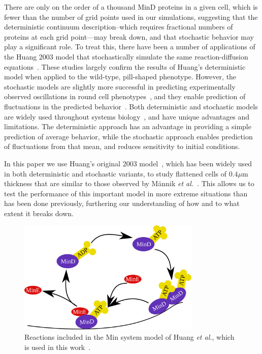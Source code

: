 \documentclass[10pt,letterpaper]{article}
\newcommand\micron{\ensuremath{\mu\text{m}}}
\begin{document}
There are only on the order of a thousand MinD proteins in a given
cell, which is fewer than the number of grid points used in our
simulations, suggesting that the deterministic continuum
description--which requires fractional numbers of proteins at each
grid point---may break down, and that stochastic behavior may play a
significant role.  To treat this, there have been a number of
applications of the Huang 2003 model that stochastically simulate the
same reaction-diffusion equations~\cite{fange2006noise,
  kerr2006division}.  These studies largely confirm the results of
Huang's deterministic model when applied to the wild-type, pill-shaped
phenotype.  However, the stochastic models are slightly more
successful in predicting experimentally observed oscillations in round
cell phenotypes~\cite{fange2006noise, huang2004min}, and they enable
prediction of fluctuations in the predicted
behavior~\cite{kruse2007experimentalist}.  Both deterministic and
stochastic models are widely used throughout systems
biology~\cite{lawson2013spatial, robb2014stochastic,
  oguz2014stochastic, fu2013deterministic, rudiger2014stochastic}, and
have unique advantages and limitations.  The deterministic approach
has an advantage in providing a simple prediction of average behavior,
while the stochastic approach enables prediction of fluctuations from
that mean, and reduces sensitivity to initial conditions.

In this paper we use Huang's original 2003
model~\cite{huang2003dynamic}, which has been widely
used~\cite{hattne2005stochastic,huang2004min,kerr2006division,
  fange2006noise} in both deterministic and stochastic variants, to
study flattened cells of $0.4\micron$ thickness that are similar to
those observed by M\"annik \emph{et al.}~\cite{mannik2009bacterial}.
This allows us to test the performance of this important model in more
extreme situations than has been done previously, furthering our
understanding of how and to what extent it breaks down.

\begin{figure}
  \includegraphics[width=8.7cm]{reactions}
  \caption{Reactions included in the Min system model of Huang
    \emph{et al.}, which is used in this
    work~\cite{huang2003dynamic}.}\label{fig:reactions}
\end{figure}
\end{document}
